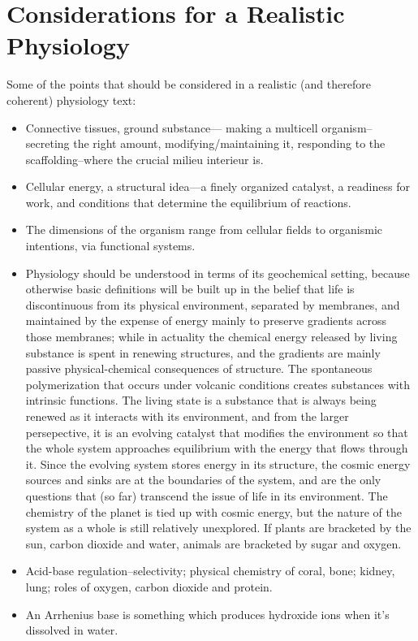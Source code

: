 \documentclass{article}
\begin{document}
\section*{Considerations for a Realistic Physiology}
Some of the points that should be considered in a realistic (and therefore coherent) physiology text:
\begin{itemize}
    \item Connective tissues, ground substance— making a multicell organism--secreting the right amount, modifying/maintaining it, responding to the scaffolding--where the crucial milieu interieur is.
    \item Cellular energy, a structural idea—a finely organized catalyst, a readiness for work, and conditions that determine the equilibrium of reactions.
    \item The dimensions of the organism range from cellular fields to organismic intentions, via functional systems.
    \item Physiology should be understood in terms of its geochemical setting, because otherwise basic definitions will be built up in the belief that life is discontinuous from its physical environment, separated by membranes, and maintained by the expense of energy mainly to preserve gradients across those membranes; while in actuality the chemical energy released by living substance is spent in renewing structures, and the gradients are mainly passive physical-chemical consequences of structure. The spontaneous polymerization that occurs under volcanic conditions creates substances with intrinsic functions. The living state is a substance that is always being renewed as it interacts with its environment, and from the larger persepective, it is an evolving catalyst that modifies the environment so that the whole system approaches equilibrium with the energy that flows through it. Since the evolving system stores energy in its structure, the cosmic energy sources and sinks are at the boundaries of the system, and are the only questions that (so far) transcend the issue of life in its environment. The chemistry of the planet is tied up with cosmic energy, but the nature of the system as a whole is still relatively unexplored. If plants are bracketed by the sun, carbon dioxide and water, animals are bracketed by sugar and oxygen.
    \item Acid-base regulation--selectivity; physical chemistry of coral, bone; kidney, lung; roles of oxygen, carbon dioxide and protein.
    \item An Arrhenius base is something which produces hydroxide ions when it’s dissolved in water.

\end{itemize}
\end{document}
